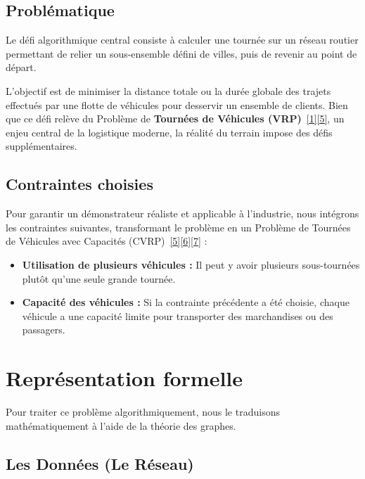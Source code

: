 \subsection{Problématique}


Le défi algorithmique central consiste à calculer une tournée sur un réseau routier permettant de relier un sous-ensemble défini de villes, puis de revenir au point de départ.

\noindent L’objectif est de minimiser la distance totale ou la durée globale des trajets effectués par une flotte de véhicules pour desservir un ensemble de clients. Bien que ce défi relève du Problème de \textbf{Tournées de Véhicules (VRP)}~\hyperlink{ref:dantzig1959}{[1]}\hyperlink{ref:toth2014}{[5]}, un enjeu central de la logistique moderne, la réalité du terrain impose des défis supplémentaires.
\subsection{Contraintes choisies}


Pour garantir un démonstrateur réaliste et applicable à l'industrie, nous intégrons les contraintes suivantes, transformant le problème en un Problème de Tournées de Véhicules avec Capacités (CVRP)~\hyperlink{ref:toth2014}{[5]}\hyperlink{ref:aimms}{[6]}\hyperlink{ref:ortools}{[7]} :
\begin{itemize}
    \item \textbf{Utilisation de plusieurs véhicules :} Il peut y avoir plusieurs sous-tournées plutôt qu'une seule grande tournée.
    \item \textbf{Capacité des véhicules :} Si la contrainte précédente a été choisie, chaque véhicule a une capacité limite pour transporter des marchandises ou des passagers.
\end{itemize}

\newpage

\section{Représentation formelle}

Pour traiter ce problème algorithmiquement, nous le traduisons mathématiquement à l'aide de la théorie des graphes.

\subsection{Les Données (Le Réseau)}


